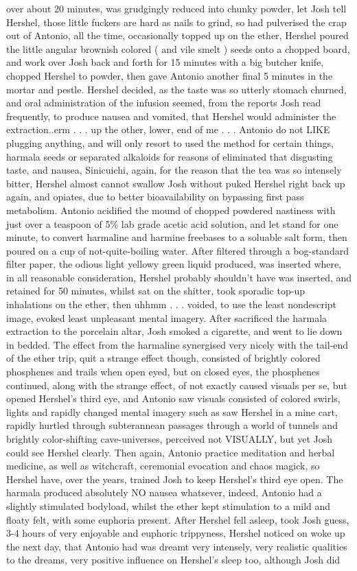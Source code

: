 \documentclass[12pt]{book}
\begin{document}
over about 20 minutes, was grudgingly reduced into chunky powder, let Josh tell Hershel, those little fuckers are hard as nails to grind, so had pulverised the crap out of Antonio, all the time, occasionally topped up on the ether, Hershel poured the little angular brownish colored ( and vile smelt ) seeds onto a chopped board, and work over Josh back and forth for 15 minutes with a big butcher knife, chopped Hershel to powder, then gave Antonio another final 5 minutes in the mortar and pestle. Hershel decided, as the taste was so utterly stomach churned, and oral administration of the infusion seemed, from the reports Josh read frequently, to produce nausea and vomited, that Hershel would administer the extraction..erm . . .  up the other, lower, end of me . . .  Antonio do not LIKE plugging anything, and will only resort to used the method for certain things, harmala seeds or separated alkaloids for reasons of eliminated that disgusting taste, and nausea, Sinicuichi, again, for the reason that the tea was so intensely bitter, Hershel almost cannot swallow Josh without puked Hershel right back up again, and opiates, due to better bioavailability on bypassing first pass metabolism. Antonio acidified the mound of chopped powdered nastiness with just over a teaspoon of 5\% lab grade acetic acid solution, and let stand for one minute, to convert harmaline and harmine freebases to a soluable salt form, then poured on a cup of not-quite-boiling water. After filtered through a bog-standard filter paper, the odious light yellowy green liquid produced, was inserted where, in all reasonable consideration, Hershel probably shouldn't have was inserted, and retained for 50 minutes, whilst sat on the shitter, took sporadic top-up inhalations on the ether, then uhhmm . . .  voided, to use the least nondescript image, evoked least unpleasant mental imagery. After sacrificed the harmala extraction to the porcelain altar, Josh smoked a cigarette, and went to lie down in bedded. The effect from the harmaline synergised very nicely with the tail-end of the ether trip, quit a strange effect though, consisted of brightly colored phosphenes and trails when open eyed, but on closed eyes, the phosphenes continued, along with the strange effect, of not exactly caused visuals per se, but opened Hershel's third eye, and Antonio saw visuals consisted of colored swirls, lights and rapidly changed mental imagery such as saw Hershel in a mine cart, rapidly hurtled through subterannean passages through a world of tunnels and brightly color-shifting cave-universes, perceived not VISUALLY, but yet Josh could see Hershel clearly. Then again, Antonio practice meditation and herbal medicine, as well as witchcraft, ceremonial evocation and chaos magick, so Hershel have, over the years, trained Josh to keep Hershel's third eye open. The harmala produced absolutely NO nausea whatsever, indeed, Antonio had a slightly stimulated bodyload, whilst the ether kept stimulation to a mild and floaty felt, with some euphoria present. After Hershel fell asleep, took Josh guess, 3-4 hours of very enjoyable and euphoric trippyness, Hershel noticed on woke up the next day, that Antonio had was dreamt very intensely, very realistic qualities to the dreams, very positive influence on Hershel's sleep too, although Josh did 
\end{document}
